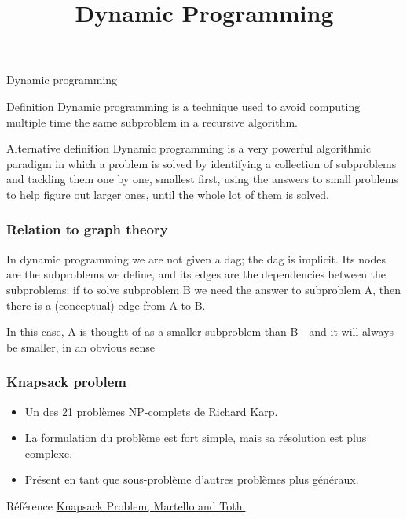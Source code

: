 \documentclass{beamer}
\title{Dynamic Programming}
\begin{document}
\frame{
  \titlepage
}


\begin{frame}{Dynamic programming}

\begin{alertblock}{Definition}
\alert{Dynamic programming is a technique used to avoid computing multiple time the same subproblem in a recursive algorithm.}
\end{alertblock}

\begin{block}{Alternative  definition}
  Dynamic programming is a very powerful algorithmic paradigm in which a problem is solved by identifying a collection of subproblems and tackling them one by one, smallest first, using the answers to small problems to help figure out larger ones, until the whole lot of them is solved.
\end{block}
\end{frame}


\begin{frame}
  \frametitle{Relation to graph theory}
  In dynamic programming we are not given a dag; the dag is implicit. Its nodes are the subproblems we define, and its edges are the dependencies between the subproblems: if to solve subproblem B we need the answer to subproblem A, then there is a (conceptual) edge from A to B.

  In this case, A is thought of as a smaller subproblem than B—and it will always be smaller, in an obvious sense


\end{frame}





\begin{frame}
  \frametitle{Knapsack problem}
  \begin{itemize}
  \item Un des 21 problèmes NP-complets de Richard Karp.
  \item La formulation du problème est fort simple, mais sa résolution est plus complexe.
  \item Présent en tant que sous-problème d'autres problèmes plus généraux.
  \end{itemize}


  \begin{block}{Référence}
    \href{http://www.or.deis.unibo.it/knapsack.html}{Knapsack Problem, Martello and Toth.}
  \end{block}
\end{frame}
\end{document}
